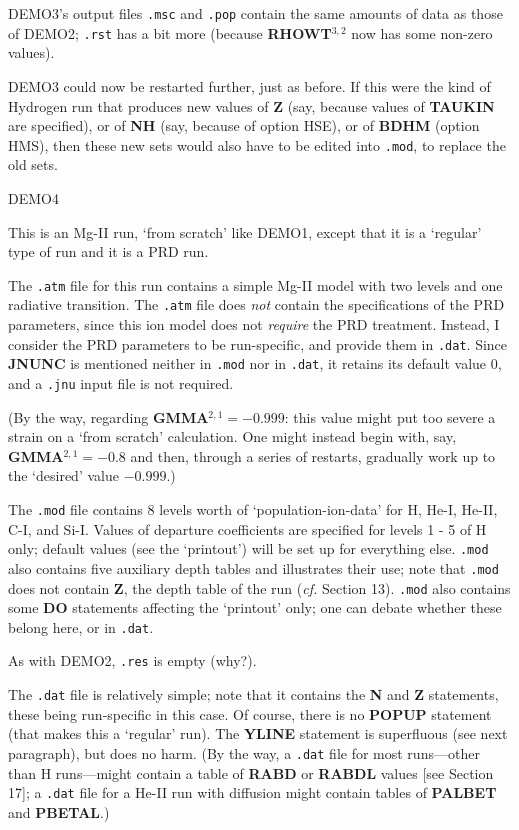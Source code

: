 DEMO3's output files {\tt .msc} and {\tt .pop} contain the same amounts of
data as those of DEMO2; {\tt .rst} has a bit more (because {\bf RHOWT}$^{3,2}$
now has some non-zero values).

DEMO3 could now be restarted further, just as before. If this were the kind
of Hydrogen run that produces new values of {\bf Z} (say, because values of
{\bf TAUKIN} are specified), or of {\bf NH} (say, because of option 
HSE), or of {\bf BDHM} (option HMS), then these new sets
would also have to be edited into {\tt .mod},
to replace the old sets.
\blankline
\blankline
\centerline{DEMO4}
\blankline
This is an Mg-II run, `from scratch' like DEMO1, except that it is a `regular'
type of run and it is a PRD run.

The {\tt .atm} file for this run contains a simple Mg-II model with two levels
and one radiative transition. The {\tt .atm} file does {\it not} contain
the specifications of the PRD parameters, since this ion model does not
{\it require} the PRD treatment. Instead, I consider the PRD parameters
to be run-specific, and provide them in {\tt .dat}.
Since {\bf JNUNC} is mentioned
neither in {\tt .mod} nor in {\tt .dat}, it retains its default value 0, and
a {\tt .jnu} input file is not required.

(By the way, regarding 
{\bf GMMA}$^{2,1} = -0.999$: this value might put too severe a strain on a
`from scratch' calculation. One might instead begin with, say,
{\bf GMMA}$^{2,1} = -0.8$ and then, through a series of restarts,
gradually work up to the `desired' value $-0.999$.)

The {\tt .mod} file contains 8 levels worth of `population-ion-data' for
H, He-I, He-II, C-I, and Si-I. Values of departure coefficients are specified
for levels 1 - 5 of H only; default values (see the `printout') will be
set up for everything else. {\tt .mod} also contains five auxiliary depth
tables and illustrates their use; note that {\tt .mod} does not contain {\bf Z},
the depth table of the run ({\it cf.} Section 13). {\tt .mod} also contains
some {\bf DO} statements affecting the `printout' only; one can debate
whether these belong here, or in {\tt .dat}.

As with DEMO2, {\tt .res} is empty (why?).

The {\tt .dat} file is relatively simple; note that it contains the {\bf N} and
{\bf Z} statements, these being run-specific in this case. Of course, there
is no {\bf POPUP} statement (that makes this a `regular' run). The {\bf YLINE}
statement is superfluous (see next paragraph), but does no harm.
(By the way, a {\tt .dat} file for most runs---other than H runs---might
contain a table of {\bf RABD} or {\bf RABDL} values [see Section 17]; a
{\tt .dat} file for a He-II run with diffusion might contain tables of
{\bf PALBET} and {\bf PBETAL}.)

